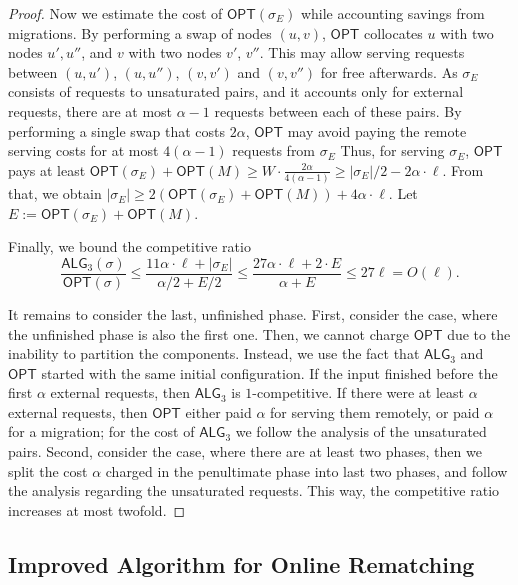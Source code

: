 \documentclass[manuscript,screen=true, review, anonymous]{acmart}
\newcommand{\OPT}{\textsf{OPT}\xspace}
\newcommand{\TAlg}{{\ensuremath{\textsf{ALG}_{3}}}\xspace}
\begin{document}
\begin{proof}
	
	Now we estimate the cost of $\OPT(\sigma_E)$ while accounting savings from migrations.
	By performing a swap of nodes $(u,v)$, $\OPT$ collocates $u$ with two nodes $u', u''$, and $v$ with two nodes $v'$, $v''$.
	This may allow serving requests between $(u,u')$, $(u,u'')$, $(v,v')$ and $(v,v'')$ for free afterwards.
	As $\sigma_E$ consists of requests to unsaturated pairs, and it accounts only for external requests, there are at most $\alpha-1$ requests between each of these pairs.
	By performing a single swap that costs $2\alpha$, $\OPT$ may avoid paying the remote serving costs for at most $4 (\alpha - 1)$ requests from $\sigma_E$
	Thus, for serving $\sigma_E$, $\OPT$ pays at least $\OPT(\sigma_E) + \OPT(M) \geq W \cdot \frac{2\alpha}{4 (\alpha-1)}\geq |\sigma_E| / 2 - 2 \alpha \cdot \ell$.
	From that, we obtain $|\sigma_E| \geq 2(\OPT(\sigma_E)+\OPT(M)) + 4\alpha \cdot \ell$.
	Let $E := \OPT(\sigma_E) + \OPT(M)$.
	
	Finally, we bound the competitive ratio
	\begin{equation*}
		\frac{\TAlg(\sigma)}{\OPT(\sigma)} \leq \frac{11\alpha \cdot \ell + |\sigma_E|}{\alpha/2 + E/2} \leq \frac{27\alpha\cdot\ell + 2\cdot E}{\alpha + E} \leq 27 \ell = O(\ell).
	\end{equation*}
	
	\medskip
	
	It remains to consider the last, unfinished phase.
	First, consider the case, where the unfinished phase is also the first one.
	Then, we cannot charge $\OPT$ due to the inability to partition the components.
	Instead, we use the fact that \TAlg and $\OPT$ started with the same initial configuration.
	If the input finished before the first $\alpha$ external requests, then \TAlg is $1$-competitive.
	If there were at least $\alpha$ external requests, then $\OPT$ either paid $\alpha$ for serving them remotely, or paid $\alpha$ for a migration; for the cost of \TAlg we follow the analysis of the unsaturated pairs.
	Second, consider the case, where there are at least two phases, then we split the cost $\alpha$ charged in the penultimate phase into last two phases, and follow the analysis regarding the unsaturated requests.
	This way, the competitive ratio increases at most twofold.
\end{proof}





\subsection{Improved Algorithm for Online Rematching}
\label{sec:k2}
\end{document}
